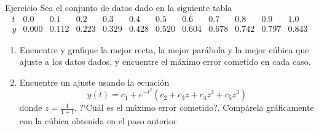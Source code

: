 \documentclass{beamer}
\begin{document}
\begin{frame}{Ejercicio}
  Sea el conjunto de datos dado en la siguiente tabla
  \scriptsize{
  $$  
  \begin{array}{c|ccccccccccc}
   t & 0.0 & 0.1 & 0.2 & 0.3 & 0.4 & 0.5 & 0.6 & 0.7 & 0.8 & 0.9 & 1.0\\\hline
   y & 0.000 & 0.112 & 0.223 & 0.329 & 0.428 & 0.520 & 0.604 & 0.678 & 0.742 & 0.797 & 0.843
  \end{array}
  $$}
  \begin{enumerate}
   \item Encuentre y grafique la mejor recta, la mejor par\'abola y la mejor c\'ubica que ajuste a los datos dados, y encuentre el m\'aximo error cometido en cada caso.
   \item Encuentre un ajuste usando la ecuaci\'on
   $$
   y(t) = c_1 + e^{-t^{2}}(c_2+c_3z+c_4z^{2}+c_5z^{3})
   $$
   donde $z=\frac{1}{1+t}$. ?`Cu\'al es el m\'aximo error cometido?. Comp\'arela gr\'aficamente con la c\'ubica obtenida en el paso anterior.
  \end{enumerate}
  \end{frame}
  
\end{document}
